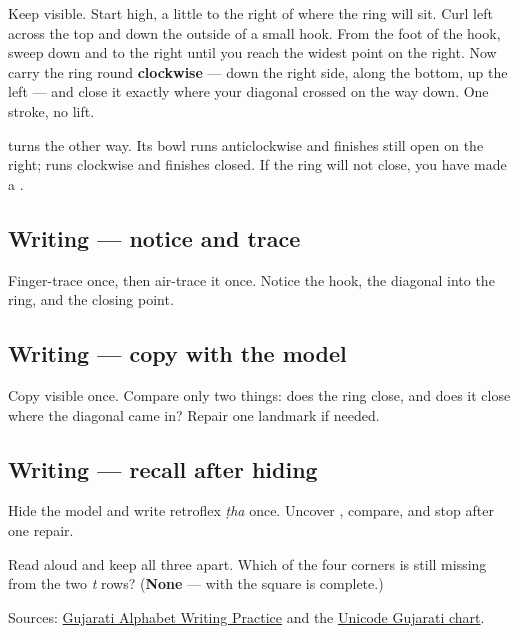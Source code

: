 Keep \textbf{} visible. Start high, a little to the right of where the ring will sit. Curl left across the top and down the outside of a small hook. From the foot of the hook, sweep down and to the right until you reach the widest point on the right. Now carry the ring round \textbf{clockwise} — down the right side, along the bottom, up the left — and close it exactly where your diagonal crossed on the way down. One stroke, no lift.

\textbf{} turns the other way. Its bowl runs anticlockwise and finishes still open on the right; \textbf{} runs clockwise and finishes closed. If the ring will not close, you have made a \textbf{}.

\subsection*{Writing — notice and trace}

Finger-trace \textbf{} once, then air-trace it once. Notice the hook, the diagonal into the ring, and the closing point.

\subsection*{Writing — copy with the model}
Copy visible \textbf{} once. Compare only two things: does the ring close, and does it close where the diagonal came in? Repair one landmark if needed.

\subsection*{Writing — recall after hiding}
Hide the model and write retroflex \emph{ṭha} once. Uncover \textbf{}, compare, and stop after one repair.

\begin{tcolorbox}[breakable,colback=teal!4,colframe=teal!35!black,title={Before you move on}]
Read \textbf{  } aloud and keep all three apart. Which of the four corners is still missing from the two \emph{t} rows? (\textbf{None} — with \textbf{} the square is complete.)

Sources: \href{https://www.t30apps.com/gujarati-alphabet-writing/}{Gujarati Alphabet Writing Practice} and the \href{https://www.unicode.org/charts/PDF/U0A80.pdf}{Unicode Gujarati chart}.
\end{tcolorbox}
